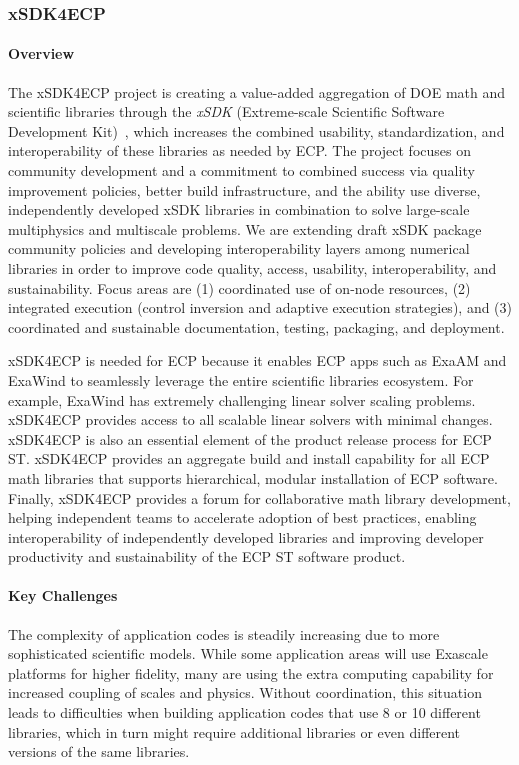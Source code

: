 \subsubsection{xSDK4ECP} 
\paragraph{Overview} The xSDK4ECP project is creating a value-added aggregation of DOE math and scientific libraries through the {\em xSDK} (Extreme-scale Scientific Software Development Kit)~\cite{xsdk:homepage}, which increases the combined usability, standardization, and interoperability of these libraries as needed by ECP. The project focuses on community development and a commitment to combined success via quality improvement policies, better build infrastructure, and the ability use diverse, independently developed xSDK libraries in combination to solve large-scale multiphysics and multiscale problems.  We are extending draft xSDK package community policies and developing interoperability layers among numerical libraries in order to improve code quality, access, usability, interoperability, and sustainability. Focus areas are (1) coordinated use of on-node resources, (2) integrated execution (control inversion and adaptive execution strategies), and (3) coordinated and sustainable documentation, testing, packaging, and deployment.

xSDK4ECP is needed for ECP because it enables ECP apps such as ExaAM and ExaWind to seamlessly leverage the entire scientific libraries ecosystem.  For example, ExaWind has extremely challenging linear solver scaling problems.  xSDK4ECP provides access to all scalable linear solvers with minimal changes.  xSDK4ECP is also an essential element of the product release process for ECP ST.  xSDK4ECP provides an aggregate build and install capability for all ECP math libraries that supports hierarchical, modular installation of ECP software.  Finally, xSDK4ECP provides a forum for collaborative math library development, helping independent teams to accelerate adoption of best practices, enabling interoperability of independently developed libraries and improving developer productivity and sustainability of the ECP ST software product.

\paragraph{Key Challenges}
The complexity of application codes is steadily increasing due to more sophisticated scientific models.  While some application areas will use Exascale platforms for higher fidelity, many are using the extra computing capability for increased coupling of scales and physics.  Without coordination, this situation  leads to difficulties when building application codes that use 8 or 10 different libraries, which in turn might require additional libraries or even different versions of the same libraries.

